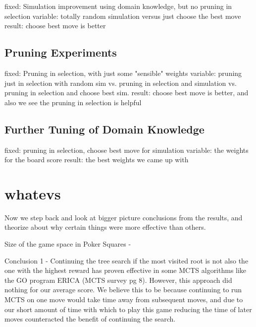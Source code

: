 \documentclass[letterpaper]{article}
\begin{document}
fixed: Simulation improvement using domain knowledge, but no pruning in selection
variable: totally random simulation versus just choose the best move 
result: choose best move is better

\subsection{Pruning Experiments}

fixed: Pruning in selection, with just some "sensible" weights
variable: pruning just in selection with random sim vs. pruning in selection and simulation vs. pruning in selection and choose best sim.
result: choose best move is better, and also we see the pruning in selection is helpful

\subsection{Further Tuning of Domain Knowledge}

fixed: pruning in selection, choose best move for simulation
variable: the weights for the board score
result: the best weights we came up with


\section{whatevs}

Now we step back and look at bigger picture conclusions from the results, and theorize about why certain things were more effective than others.

Size of the game space in Poker Squares - 

Conclusion 1 - Continuing the tree search if the most visited root is not also the one with the highest reward has proven effective in some MCTS algorithms like the GO program ERICA (MCTS survey pg 8). However, this approach did nothing for our average score. We believe this to be because continuing to run MCTS on one move would take time away from subsequent moves, and due to our short amount of time with which to play this game reducing the time of later moves counteracted the benefit of continuing the search.
\end{document}
